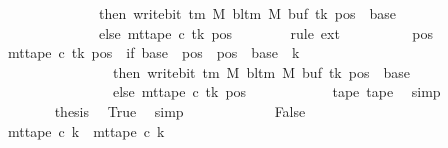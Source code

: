 \begin{isabellebody}
\ \ \ \ \ \ \ \ \ \ \ \ \ \ then\ write{\isacharunderscore}{\kern0pt}bit\ {\isacharparenleft}{\kern0pt}{\isasymGamma}{\isacharunderscore}{\kern0pt}tm\ M{\isacharparenright}{\kern0pt}\ {\isacharparenleft}{\kern0pt}bl{\isacharunderscore}{\kern0pt}tm\ M{\isacharparenright}{\kern0pt}\ {\isacharparenleft}{\kern0pt}buf\ tk{\isacharparenright}{\kern0pt}\ {\isacharparenleft}{\kern0pt}pos\ {\isacharminus}{\kern0pt}\ base{\isacharparenright}{\kern0pt}\isanewline
\ \ \ \ \ \ \ \ \ \ \ \ \ \ else\ mt{\isacharunderscore}{\kern0pt}tape\ c{\isacharprime}{\kern0pt}\ tk\ pos{\isacharparenright}{\kern0pt}{\isachardoublequoteclose}\isanewline
\ \ \ \ \ \ \isamarkupfalse%
\ {\isacharparenleft}{\kern0pt}rule\ ext{\isacharparenright}{\kern0pt}\isanewline
\ \ \ \ \ \ \ \ \isamarkupfalse%
\ pos\isanewline
\ \ \ \ \ \ \ \ \isamarkupfalse%
\ {\isachardoublequoteopen}mt{\isacharunderscore}{\kern0pt}tape\ c{}\ tk\ pos\ {\isacharequal}{\kern0pt}\ {\isacharparenleft}{\kern0pt}if\ base\ {\isasymle}\ pos\ {\isasymand}\ pos\ {\isacharless}{\kern0pt}\ base\ {\isacharplus}{\kern0pt}\ {\isacharparenleft}{\kern0pt}{\isacharquery}{\kern0pt}k\ {\isacharminus}{\kern0pt}\ {}{\isacharparenright}{\kern0pt}\isanewline
\ \ \ \ \ \ \ \ \ \ \ \ \ \ \ \ then\ write{\isacharunderscore}{\kern0pt}bit\ {\isacharparenleft}{\kern0pt}{\isasymGamma}{\isacharunderscore}{\kern0pt}tm\ M{\isacharparenright}{\kern0pt}\ {\isacharparenleft}{\kern0pt}bl{\isacharunderscore}{\kern0pt}tm\ M{\isacharparenright}{\kern0pt}\ {\isacharparenleft}{\kern0pt}buf\ tk{\isacharparenright}{\kern0pt}\ {\isacharparenleft}{\kern0pt}pos\ {\isacharminus}{\kern0pt}\ base{\isacharparenright}{\kern0pt}\isanewline
\ \ \ \ \ \ \ \ \ \ \ \ \ \ \ \ else\ mt{\isacharunderscore}{\kern0pt}tape\ c{\isacharprime}{\kern0pt}\ tk\ pos{\isacharparenright}{\kern0pt}{\isachardoublequoteclose}\isanewline
\ \ \ \ \ \ \ \ \ \ \isamarkupfalse%
\ tape{}\ tape{}\ \isamarkupfalse%
\ simp\isanewline
\ \ \ \ \ \ \isamarkupfalse%
\isanewline
\ \ \ \ \ \ \isamarkupfalse%
\ {\isacharquery}{\kern0pt}thesis\ \isamarkupfalse%
\ True\ \isamarkupfalse%
\ simp\isanewline
\ \ \ \ \isamarkupfalse%
\isanewline
\ \ \ \ \ \ \isamarkupfalse%
\ False\isanewline
\ \ \ \ \ \ \isamarkupfalse%
\ {\isachardoublequoteopen}mt{\isacharunderscore}{\kern0pt}tape\ c{}\ k{\isacharprime}{\kern0pt}\ {\isacharequal}{\kern0pt}\ mt{\isacharunderscore}{\kern0pt}tape\ c{}\ k{\isacharprime}{\kern0pt}{\isachardoublequoteclose}\ \isamarkupfalse%

\end{isabellebody}
